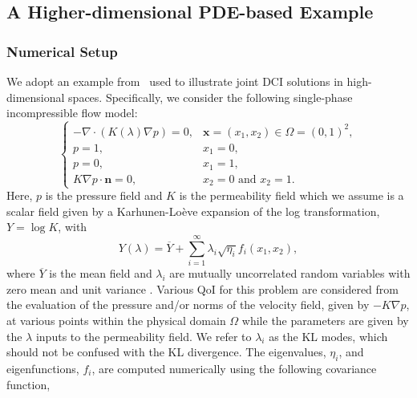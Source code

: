 \documentclass{article}
\newcounter{example}[section]
\begin{document}


\subsection{A Higher-dimensional PDE-based Example}\label{sec:example2}

\subsubsection{Numerical Setup}

We adopt an example from~\cite{BJW18a} used to illustrate joint DCI solutions in high-dimensional spaces.
Specifically, we consider the following single-phase incompressible flow model:
\begin{equation}\label{eq:porous}
\begin{cases}
    -\nabla \cdot (K(\lambda) \nabla p) = 0, & \mathbf{x}=(x_1,x_2)\in\Omega = (0,1)^2,\\
    p = 1, & x_1=0, \\
    p = 0, & x_1=1, \\
    K\nabla p \cdot \mathbf{n} = 0, & x_2=0 \text{ and } x_2=1.
    \end{cases}
\end{equation}
Here, $p$ is the pressure field and $K$ is the permeability field which we assume is a scalar field given by a Karhunen-Lo\`eve expansion of the log transformation, $Y = \log{K}$, with
\begin{equation*}
    Y(\lambda) = \overline{Y} + \sum_{i=1}^\infty \lambda_i\sqrt{\eta_i}f_i(x_1,x_2),
\end{equation*}
where $\overline{Y}$ is the mean field and $\lambda_i$ are mutually uncorrelated random variables with zero mean and unit variance \cite{ganis2008stochastic,wheeler2011multiscale}.
Various QoI for this problem are considered from the evaluation of the pressure and/or norms of the velocity field, given by $-K\nabla p$, at various points within the physical domain $\Omega$ while the parameters are given by the $\lambda$ inputs to the permeability field.
We refer to $\lambda_i$ as the KL modes, which should not be confused with the KL divergence.
The eigenvalues, $\eta_i$, and eigenfunctions, $f_i$, are computed numerically using the following covariance function,
\end{document}
